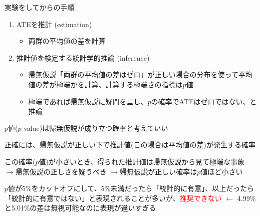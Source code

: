 \begin{frame}[t, label=RCTProcedures]{}
実験をしてからの手順
\begin{enumerate}
\vspace{1.0ex}\setlength{\itemsep}{1.0ex}\setlength{\baselineskip}{12pt}
\item	ATEを推計 (estimation)
	\begin{itemize}
\pause
	\vspace{1.0ex}\setlength{\itemsep}{1.0ex}\setlength{\baselineskip}{12pt}
	\item	両群の平均値の差を計算
	\end{itemize}
\pause
\item	推計値を検定する統計学的推論 (inference)
	\begin{itemize}
	\vspace{1.0ex}\setlength{\itemsep}{1.0ex}\setlength{\baselineskip}{12pt}
\pause
	\item	帰無仮説「両群の平均値の差はゼロ」が正しい場合の分布を使って平均値の差が極端かを計算、計算する極端さの指標は$p$値
\pause
	\item	極端であれば帰無仮説に疑問を呈し、$p$の確率でATEはゼロではない、と推論
	\end{itemize}
\end{enumerate}
\pause
\begin{dinglist}{45}
\vspace{1.0ex}\setlength{\itemsep}{1.0ex}\setlength{\baselineskip}{12pt}
\item	$p$値($p$ value)は帰無仮説が成り立つ確率と考えていい
	\begin{dinglist}{43}\footnotesize
	\vspace{1.0ex}\setlength{\itemsep}{1.0ex}\setlength{\baselineskip}{10pt}
	\pause
	\item	正確には、帰無仮説が正しい下で推計値(この場合は平均値の差)が発生する確率
	\pause
	\item	この確率($p$値)が小さいとき、得られた推計値は帰無仮説から見て極端な事象\pause
	$\rightarrow$帰無仮説の正しさを疑うべき\pause
	$\rightarrow$帰無仮説が正しい確率は$p$値ほど小さい\\[2ex]
	\end{dinglist}
\pause
\item	$p$値が5\%をカットオフにして、5\%未満だったら「統計的に有意」、以上だったら「統計的に有意ではない」と表現されることが多いが、\textcolor{red}{推奨できない} $\leftarrow$ 4.99\%と5.01\%の差は無視可能なのに表現が違いすぎる
\end{dinglist}
\end{frame}

